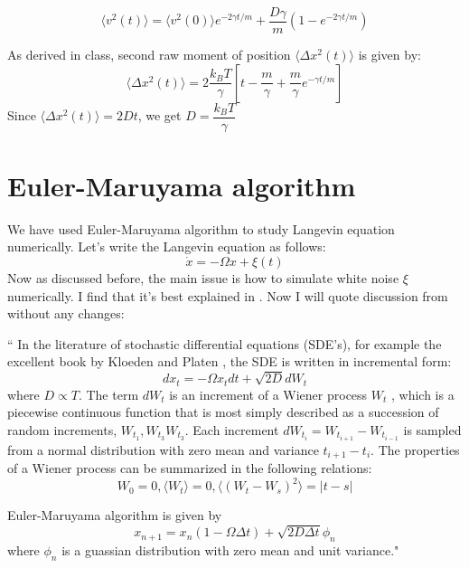 \documentclass[11pt,a4paper]{article}
\begin{document}
\begin{equation}
\langle v^2 (t) \rangle = \langle v^2 (0) \rangle e^{-2\gamma t /m} + \dfrac{D \gamma}{m}(1-e^{-2\gamma t /m})
\label{var_vel}
\end{equation}

As derived in class, second raw moment of position $\langle \Delta x^2 (t) \rangle$ is given by:
\begin{equation}
\langle \Delta x^2 (t) \rangle = 2 \dfrac{k_B T}{\gamma}\left[t-\dfrac{m}{\gamma} +\dfrac{m}{\gamma}e^{-\gamma t /m} \right]
\end{equation}
Since $\langle \Delta x^2 (t) \rangle= 2 D t$, we get $D=\dfrac{k_B T}{\gamma}$

\section{Euler-Maruyama algorithm}\label{sec.Numerics}
We have used Euler-Maruyama algorithm to study Langevin equation numerically. Let's write the Langevin equation as follows:
\begin{equation}
\dot{x}= -\Omega x + \xi(t)
\end{equation}
Now as discussed before, the main issue is how to simulate white noise $\xi$ numerically. 
I find that it's best explained in \cite{ladd2015numerical}. Now I will quote discussion from \cite{ladd2015numerical}  without any changes:

`` In the literature of stochastic differential equations (SDE’s), for example the excellent book by Kloeden and Platen , the SDE is written in incremental form:
\begin{equation}
dx_t= -\Omega x_t dt + \sqrt{2D} dW_t
\end{equation}
where $D \propto T$. The term $dW_t$ is an increment of a Wiener process $W_t$ , which is a piecewise continuous function that is most simply described as a succession of random increments, 
$W_{t_1} ,W_{t_3} W_{t_3}$. Each increment $dW_{t_i}= W_{t_{i+1}}- W_{t_{i-1}}$ is sampled from a normal distribution with zero mean and variance $t_{i+1}- t_{i}$. The properties of a Wiener process can be summarized in the following relations:
\begin{equation}
W_0=0, \langle W_t\rangle=0, \langle (W_t - W_s)^2\rangle=|t-s|
\end{equation}

Euler-Maruyama algorithm is given by 
\begin{equation}
x_{n+1}= x_n (1 - \Omega \Delta t) + \sqrt{2 D \Delta t} \phi_n
\end{equation}
where $\phi_n$ is a guassian distribution with zero mean and unit variance."

 


\end{document}
